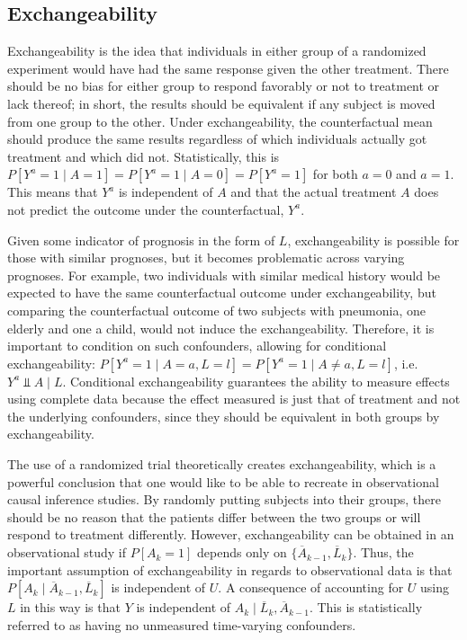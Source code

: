\subsection{Exchangeability} \label{exchangeability} 
Exchangeability is the idea that individuals in either group of a randomized experiment would have had the same response given the other treatment. \cite{hernan_robins_2016}  There should be no bias for either group to respond favorably or not to treatment or lack thereof; in short, the results should be equivalent if any subject is moved from one group to the other.  Under exchangeability, the counterfactual mean should produce the same results regardless of which individuals actually got treatment and which did not.  Statistically, this is $P[Y^a = 1 \mid A = 1] = P[Y^a = 1 \mid A = 0] = P[Y^a = 1]$ for both $a=0$ and $a=1$.  This means that $Y^a$ is independent of $A$ and that the actual treatment $A$ does not predict the outcome under the counterfactual, $Y^a$.  

Given some indicator of prognosis in the form of $L$, exchangeability is possible for those with similar prognoses, but it becomes problematic across varying prognoses.  For example, two individuals with similar medical history would be expected to have the same counterfactual outcome under exchangeability, but comparing the counterfactual outcome of two subjects with pneumonia, one elderly and one a child, would not induce the exchangeability.  Therefore, it is important to condition on such confounders, allowing for conditional exchangeability: $P[Y^a = 1 \mid A = a, L=l] = P[Y^a = 1 \mid A \neq a, L=l]$, i.e. $Y^{a} \Perp A\mid L$. \cite{hernan_robins_2016}  Conditional exchangeability guarantees the ability to measure effects using complete data because the effect measured is just that of treatment and not the underlying confounders, since they should be equivalent in both groups by exchangeability.  

The use of a randomized trial theoretically creates exchangeability, which is a powerful conclusion that one would like to be able to recreate in observational causal inference studies.   By randomly putting subjects into their groups, there should be no reason that the patients differ between the two groups or will respond to treatment differently.  However, exchangeability can be obtained in an observational study if $P[A_k = 1]$ depends only on $\{\overline{A}_{k-1}, \overline{L}_{k} \}$. Thus, the important assumption of exchangeability in regards to observational data is that  $ P[A_k \mid \overline{A}_{k-1}, \overline{L}_{k} ]$ is independent of $U$.   A consequence of accounting for $U$ using $L$ in this way is that $Y$ is independent of $A_k \mid  \overline{L}_{k}, \overline{A}_{k-1}$.  This is statistically referred to as having no unmeasured time-varying confounders.  


